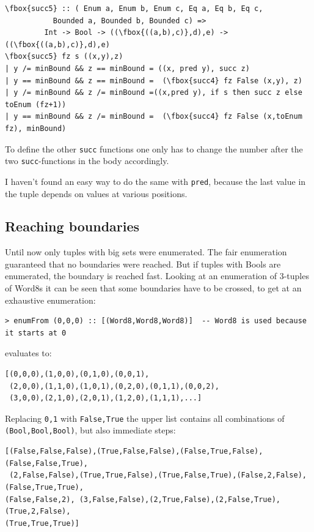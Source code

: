 \documentclass{tmr}
\begin{document}

\begin{Verbatim}[commandchars=\\\{\}]
\fbox{succ5} :: ( Enum a, Enum b, Enum c, Eq a, Eq b, Eq c,
           Bounded a, Bounded b, Bounded c) =>
         Int -> Bool -> ((\fbox{((a,b),c)},d),e) -> ((\fbox{((a,b),c)},d),e)
\fbox{succ5} fz s ((x,y),z)
| y /= minBound && z == minBound = ((x, pred y), succ z)
| y == minBound && z == minBound =  (\fbox{succ4} fz False (x,y), z)
| y /= minBound && z /= minBound =((x,pred y), if s then succ z else toEnum (fz+1))
| y == minBound && z /= minBound =  (\fbox{succ4} fz False (x,toEnum fz), minBound)
\end{Verbatim}
To define the other \verb|succ| functions one only has to change the number after the two \verb|succ|-functions in the body accordingly. 

I haven't found an easy way to do the same with \verb|pred|, because the last value in the tuple depends on values at various positions.

\subsection{Reaching boundaries}
Until now only tuples with big sets were enumerated. The fair enumeration guaranteed that no boundaries were reached. But if tuples with Bools are enumerated, the boundary is reached fast. Looking at an enumeration of 3-tuples of Word8s it can be seen that some boundaries have to be crossed, to get at an exhaustive enumeration:

\begin{Verbatim}
> enumFrom (0,0,0) :: [(Word8,Word8,Word8)]  -- Word8 is used because it starts at 0
\end{Verbatim}

evaluates to:

\begin{Verbatim}
[(0,0,0),(1,0,0),(0,1,0),(0,0,1),
 (2,0,0),(1,1,0),(1,0,1),(0,2,0),(0,1,1),(0,0,2),
 (3,0,0),(2,1,0),(2,0,1),(1,2,0),(1,1,1),...]
\end{Verbatim}
Replacing \verb|0,1| with \verb|False,True| the upper list contains all combinations of \verb|(Bool,Bool,Bool)|, but also immediate steps:
\begin{Verbatim}
[(False,False,False),(True,False,False),(False,True,False),(False,False,True),
 (2,False,False),(True,True,False),(True,False,True),(False,2,False),(False,True,True),
(False,False,2), (3,False,False),(2,True,False),(2,False,True),(True,2,False),
(True,True,True)]
\end{Verbatim}
\end{document}
